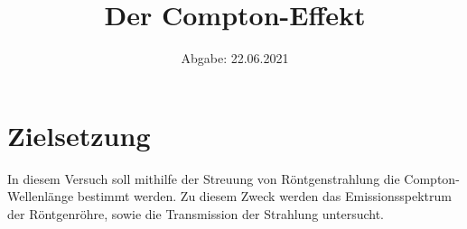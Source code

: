 
\usepackage{parskip}

\subject{V603}
\title{Der Compton-Effekt}
\date{
    Abgabe: 22.06.2021
}



\maketitle
\thispagestyle{empty}
\tableofcontents
\newpage

\section{Zielsetzung}

    In diesem Versuch soll mithilfe der Streuung von Röntgenstrahlung die Compton-Wellenlänge bestimmt werden.
    Zu diesem Zweck werden das Emissionsspektrum der Röntgenröhre,
    sowie die Transmission der Strahlung untersucht.
    

\clearpage


\clearpage


\clearpage

%

%

\printbibliography


